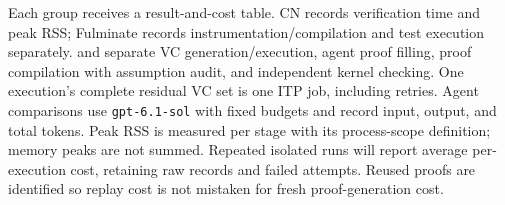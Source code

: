 Each group receives a result-and-cost table. CN records verification time and
peak RSS; Fulminate records instrumentation/compilation and test execution
separately. \qcp{} and \tespec{} separate VC generation/execution, agent proof
filling, proof compilation with assumption audit, and independent kernel
checking. One execution's complete residual VC set is one ITP job, including
retries. Agent comparisons use \texttt{gpt-6.1-sol} with fixed budgets and
record input, output, and total tokens. Peak RSS is measured per stage with
its process-scope definition; memory peaks are not summed. Repeated isolated
runs will report average per-execution cost, retaining raw records and failed
attempts. Reused proofs are identified so replay cost is not mistaken for
fresh proof-generation cost.
